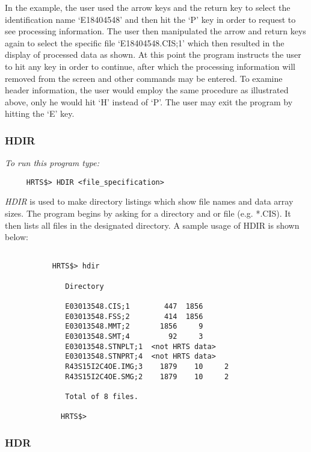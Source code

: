     In the example, the user used the arrow keys and the return key to
    select the identification name `E18404548' and then hit the `P' key in
    order to request to see processing information.  The user then
    manipulated the arrow and return keys again to select the specific file
    `E18404548.CIS;1' which then resulted in the display of processed data
    as shown.  At this point the program instructs the user to hit any key
    in order to continue, after which the processing information will      
    removed from the screen and other commands may be entered.
    To examine header information, the user would employ the same
    procedure as illustrated above, only he would hit `H' instead of `P'.
    The user may exit the program by hitting the `E' key.

\subsubsection{HDIR}                

{\em To run this program type:}    
\begin{verbatim}
     HRTS$> HDIR <file_specification>   
\end{verbatim}
   {\em HDIR} is used to make directory listings which show file names and
    data array sizes.  The program begins by asking for a directory and or file
    (e.g. *.CIS). It then lists all files in the designated directory.
    A sample usage of HDIR is shown below:
         
\begin{verbatim}

           HRTS$> hdir 
                                            
              Directory  
                
              E03013548.CIS;1        447  1856
              E03013548.FSS;2        414  1856
              E03013548.MMT;2       1856     9
              E03013548.SMT;4         92     3
              E03013548.STNPLT;1  <not HRTS data>
              E03013548.STNPRT;4  <not HRTS data>
              R43S15I2C4OE.IMG;3    1879    10     2
              R43S15I2C4OE.SMG;2    1879    10     2
                
              Total of 8 files.

             HRTS$>              

\end{verbatim}

\subsubsection{HDR}

